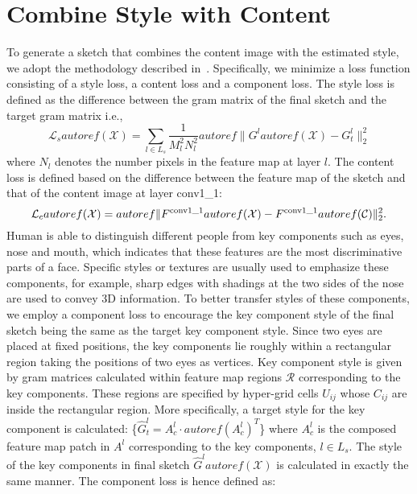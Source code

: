 \documentclass[10pt,twocolumn,letterpaper]{article}
\begin{document}
{
\section{Combine Style with Content}
}
To generate a sketch that combines the content image with the estimated style, we adopt the methodology described in~\cite{gatys2015texture}. Specifically, we minimize a loss function consisting of a style loss, a content loss and a component loss. The style loss is defined as the difference between the gram matrix of the final sketch and the target gram matrix i.e.,
\begin{equation}
\mathcal{L}_{s} autoref( \mathcal{X} ) = \sum\limits_{l \in {L_s}} {\frac{1}{{M_l^2N_l^2}}autoref\| {{G^l}autoref( \mathcal{X} ) - G_t^l} \|_2^2} 
\label{eq:Gram_loss}
\end{equation}
where $N_l$ denotes the number pixels in the feature map at layer $l$. The content loss is defined based on the difference between the feature map of the sketch and that of the content image at layer conv1\_1:
\begin{equation}
\mathcal{L}_{c}autoref( \mathcal{X} ) = autoref\| {{F^{\rm{conv1\_1}}}autoref( \mathcal{X} ) - {F^{\rm{conv1\_1}}}autoref( \mathcal{C} )} \|_2^2.
\label{eq:Style_loss}
\end{equation}
Human is able to distinguish different people from key components such as eyes, nose and mouth, which indicates that these features are the most discriminative parts of a face. Specific styles or textures are usually used to emphasize these components, for example, sharp edges with shadings at the two sides of the nose are used to convey 3D information. To better transfer styles of these components, we employ a component loss to encourage the key component style of the final sketch being the same as the target key component style. Since two eyes are placed at fixed positions, the key components lie roughly within a rectangular region taking the positions of two eyes as vertices. Key component style is given by gram matrices calculated within feature map regions $\mathcal R$ corresponding to the key components. These regions are specified by hyper-grid cells $U_{ij}$ whose $C_{ij}$ are inside the rectangular region. More specifically, a target style for the key component is calculated: \{${\hat G}_{t}^l ={A}_{c}^l \cdot {autoref( {{{A}_{c}^l}} )^T}$\} where ${A}_{c}^l$ is the composed feature map patch in $A^{l}$ corresponding to the key components, $l\in L_s$. The style of the key components in final sketch ${\hat G}^lautoref( \mathcal{X} ) $ is calculated in exactly the same manner. The component loss is hence defined as:
\end{document}

